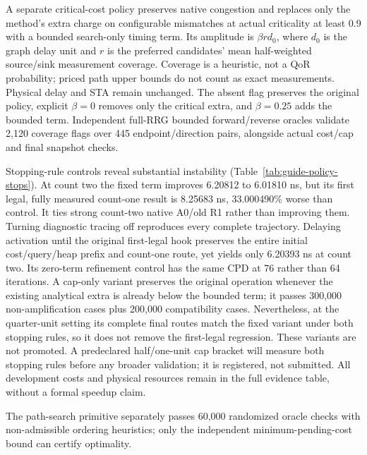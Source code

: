 \documentclass[conference,10pt]{IEEEtran}
\begin{document}
A separate critical-cost policy preserves native congestion and replaces only the method's extra charge on configurable mismatches at actual criticality at least 0.9 with a bounded search-only timing term. Its amplitude is $\beta r d_0$, where $d_0$ is the graph delay unit and $r$ is the preferred candidates' mean half-weighted source/sink measurement coverage. Coverage is a heuristic, not a QoR probability; priced path upper bounds do not count as exact measurements. Physical delay and STA remain unchanged. The absent flag preserves the original policy, explicit $\beta=0$ removes only the critical extra, and $\beta=0.25$ adds the bounded term. Independent full-RRG bounded forward/reverse oracles validate 2,120 coverage flags over 445 endpoint/direction pairs, alongside actual cost/cap and final snapshot checks.

Stopping-rule controls reveal substantial instability (Table~\ref{tab:guide-policy-stops}). At count two the fixed term improves 6.20812 to 6.01810 ns, but its first legal, fully measured count-one result is 8.25683 ns, 33.000490\% worse than control. It ties strong count-two native A0/old R1 rather than improving them. Turning diagnostic tracing off reproduces every complete trajectory. Delaying activation until the original first-legal hook preserves the entire initial cost/query/heap prefix and count-one route, yet yields only 6.20393 ns at count two. Its zero-term refinement control has the same CPD at 76 rather than 64 iterations. A cap-only variant preserves the original operation whenever the existing analytical extra is already below the bounded term; it passes 300,000 non-amplification cases plus 200,000 compatibility cases. Nevertheless, at the quarter-unit setting its complete final routes match the fixed variant under both stopping rules, so it does not remove the first-legal regression. These variants are not promoted. A predeclared half/one-unit cap bracket will measure both stopping rules before any broader validation; it is registered, not submitted. All development costs and physical resources remain in the full evidence table, without a formal speedup claim.





 The path-search primitive separately passes 60,000 randomized oracle checks with non-admissible ordering heuristics; only the independent minimum-pending-cost bound can certify optimality.
\end{document}
